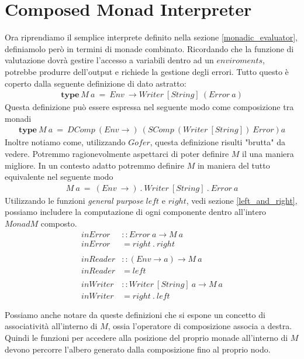 \section{Composed Monad Interpreter}
\label{composed_monad_interpreter}

Ora riprendiamo il semplice interprete definito nella sezione
\ref{monadic_evaluator}, definiamolo però in termini di monade combinato.
Ricordando che la funzione di valutazione dovrà gestire l'accesso a variabili
dentro ad un $enviroments$, potrebbe produrre dell'output e richiede la gestione
degli errori.
Tutto questo è coperto dalla seguente definizione di dato astratto:
\begin{align*}
  \bm{type}\ M\ a\ =\ Env\ \to Writer\ [String]\ (Error\ a)
\end{align*}
Questa definizione può essere espressa nel seguente modo come composizione tra
monadi
\begin{align*}
  \bm{type}\ M\ a\ =\ DComp\ (Env \to)\ (SComp\ (Writer\ [String])\ Error) a
\end{align*}
Inoltre notiamo come, utilizzando $Gofer$, questa definizione risulti "brutta"
da vedere.
Potremmo ragionevolmente aspettarci di poter definire $M$ il una maniera migliore.
In un contesto adatto potremmo definire $M$ in maniera del tutto equivalente nel
seguente modo
\begin{align*}
  M\ a\ =\ (Env\ \to)\ .\ Writer\ [String]\ .\ Error\ a
\end{align*}
Utilizzando le funzioni \textit{general purpose} $left$ e $right$, vedi sezione
\ref{left_and_right}, possiamo includere la computazione di ogni componente dentro
all'intero $Monad M$ composto.
\begin{align*}
  inError &:: Error\ a \to M\ a\\
  inError &= right\ .\ right\\\\
  inReader &:: (Env \to a) \to M\ a\\
  inReader &= left\\\\
  inWriter &:: Writer\ [String]\ a \to M\ a\\
  inWriter &= right\ .\ left\\\\
\end{align*}
Possiamo anche notare da queste definizioni che si espone un concetto di associatività
all'interno di $M$, ossia l'operatore di composizione associa a destra.
Quindi le funzioni per accedere alla posizione del proprio monade all'interno di
$M$ devono percorre l'albero generato dalla composizione fino al proprio nodo.\\

